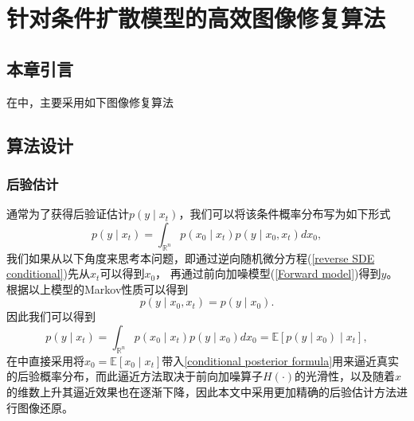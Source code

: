 \chapter{针对条件扩散模型的高效图像修复算法}
\section{本章引言}
在\cite{Inverse}中，主要采用如下图像修复算法   

\section{算法设计}
\subsection{后验估计}
通常为了获得后验证估计$p(y\mid x_t)$，我们可以将该条件概率分布写为如下形式
\begin{equation}
    p(y\mid x_t) = \int_{\mathbb{R}^n} p(x_0\mid x_t) p(y\mid x_0,x_t) dx_0,
\end{equation}
我们如果从以下角度来思考本问题，即通过逆向随机微分方程(\ref{reverse SDE conditional})先从$x_t$可以得到$x_0$， 再通过前向加噪模型(\ref{Forward model})得到$y$。根据以上模型的Markov性质可以得到
\begin{equation}
     p(y\mid x_0,x_t) = p(y\mid x_0).
\end{equation}
因此我们可以得到
\begin{equation}
    p(y\mid x_t) = \int_{\mathbb{R}^n} p(x_0\mid x_t) p(y\mid x_0) dx_0=\mathbb{E}\left[p(y\mid x_0)\mid x_t\right],
    \label{conditional posterior formula}
\end{equation}
在\cite{Inverse}中直接采用将$\hat{x}_0=\mathbb{E}\left[x_0\mid x_t\right]$带入\ref{conditional posterior formula}用来逼近真实的后验概率分布，而此逼近方法取决于前向加噪算子$H(\cdot)$的光滑性，以及随着$x$的维数上升其逼近效果也在逐渐下降，因此本文中采用更加精确的后验估计方法进行图像还原。     


